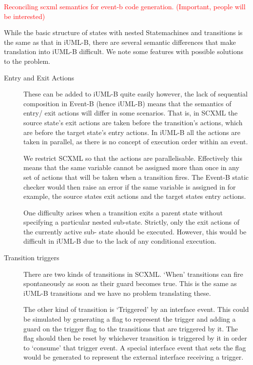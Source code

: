 \documentclass{easychair}
\begin{document}
\textcolor{red}{Reconciling scxml semantics for event-b code generation.  
(Important, people will be interested)}

While the basic structure of states with nested Statemachines and 
transitions is the same as that in iUML-B, there are several semantic 
differences that make translation into iUML-B difficult. We note some 
features with possible solutions to the problem.

\begin{description}
\item [Entry and Exit Actions] These can be added to iUML-B 
quite easily however, the lack of sequential composition in 
Event-B (hence iUML-B) means that the semantics of entry/
exit actions will differ in some scenarios. That is, in 
SCXML the source state’s exit actions are taken before the 
transition’s actions, which are before the target state’s 
entry actions. In iUML-B all the actions are taken in 
parallel, as there is no concept of execution order within 
an event. 

We restrict SCXML so that the actions are parallelisable. 
Effectively this means that the same variable cannot be 
assigned more than once in any set of actions that will be 
taken when a transition fires. The Event-B static checker 
would then raise an error if the same variable is assigned 
in for example, the source states exit actions and the 
target states entry actions. 

One difficulty arises when a transition exits a parent 
state without specifying a particular nested sub-state. 
Strictly, only the exit actions of the currently active sub-
state should be executed. However, this would be difficult 
in iUML-B due to the lack of any conditional execution.

\item [Transition triggers] There are two kinds of transitions in SCXML. 
‘When’ transitions can fire spontaneously as soon as their 
guard becomes true. This is the same as iUML-B transitions 
and we have no problem translating these.

The other kind of transition is ‘Triggered’ by an interface 
event. This could be simulated by generating a flag to 
represent the trigger and adding a guard on the trigger 
flag to the transitions that are triggered by it. The flag 
should then be reset by whichever transition is triggered 
by it in order to ‘consume’ that trigger event. A special 
interface event that sets the flag would be generated to 
represent the external interface receiving a trigger.


\end{description}
\end{document}
